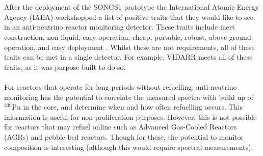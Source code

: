 \\\\After the deployment of the SONGS1 prototype the International Atomic Energy Agency (IAEA) workshopped a list of positive traits that they would like to see in an anti-neutrino reactor monitoring detector. These traits include inert construction, non-liquid, easy operation, cheap, portable, robust, above-ground operation, and easy deployment \cite{IAEA_2008}. Whilst these are not requirements, all of these traits can be met in a single detector. For example, VIDARR meets all of these traits, as it was purpose built to do so. 
\\\\For reactors that operate for long periods without refuelling, anti-neutrino monitoring has the potential to correlate the measured spectra with build up of $^{239}$Pu in the core, and determine when and how often refuelling occurs. This information is useful for non-proliferation purposes. However, this is not possible for reactors that may refuel online such as Advanced Gas-Cooled Reactors (AGRs) and pebble bed reactors. Though for these, the potential to monitor composition is interesting (although this would require spectral measurements).

